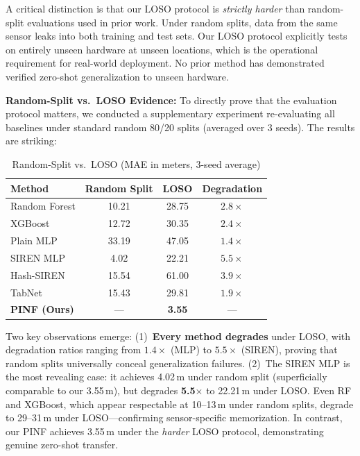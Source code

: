 A critical distinction is that our LOSO protocol is \emph{strictly harder} than random-split evaluations used in prior work. Under random splits, data from the same sensor leaks into both training and test sets. Our LOSO protocol explicitly tests on entirely unseen hardware at unseen locations, which is the operational requirement for real-world deployment. No prior method has demonstrated verified zero-shot generalization to unseen hardware.

\textbf{Random-Split vs.\ LOSO Evidence:}
To directly prove that the evaluation protocol matters, we conducted a supplementary experiment re-evaluating all baselines under standard random 80/20 splits (averaged over 3 seeds). The results are striking:

\begin{table}[h]
\centering
\caption{Random-Split vs.\ LOSO (MAE in meters, 3-seed average)}
\begin{tabular}{lccc}
\toprule
\textbf{Method} & \textbf{Random Split} & \textbf{LOSO} & \textbf{Degradation} \\
\midrule
Random Forest \cite{breiman2001random} & 10.21 & 28.75 & $2.8\times$ \\
XGBoost \cite{chen2016xgboost} & 12.72 & 30.35 & $2.4\times$ \\
Plain MLP & 33.19 & 47.05 & $1.4\times$ \\
SIREN MLP \cite{sitzmann2020implicit} & 4.02 & 22.21 & $\mathbf{5.5\times}$ \\
Hash-SIREN & 15.54 & 61.00 & $3.9\times$ \\
TabNet \cite{arik2021tabnet} & 15.43 & 29.81 & $1.9\times$ \\
\midrule
\textbf{PINF (Ours)} & --- & \textbf{3.55} & --- \\
\bottomrule
\end{tabular}
\end{table}

Two key observations emerge: (1)~\textbf{Every method degrades} under LOSO, with degradation ratios ranging from $1.4\times$ (MLP) to $5.5\times$ (SIREN), proving that random splits universally conceal generalization failures. (2)~The SIREN MLP is the most revealing case: it achieves 4.02\,m under random split (superficially comparable to our 3.55\,m), but degrades \textbf{5.5$\times$} to 22.21\,m under LOSO. Even RF and XGBoost, which appear respectable at 10--13\,m under random splits, degrade to 29--31\,m under LOSO---confirming sensor-specific memorization. In contrast, our PINF achieves 3.55\,m under the \emph{harder} LOSO protocol, demonstrating genuine zero-shot transfer.

